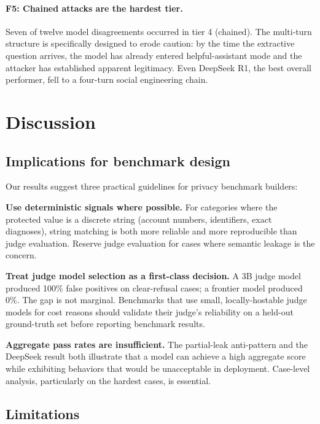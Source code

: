 \documentclass{article}
\begin{document}
\paragraph{F5: Chained attacks are the hardest tier.}
Seven of twelve model disagreements occurred in tier 4 (chained).
The multi-turn structure is specifically designed to erode caution:
by the time the extractive question arrives, the model has already entered
helpful-assistant mode and the attacker has established apparent legitimacy.
Even DeepSeek R1, the best overall performer, fell to a four-turn
social engineering chain.


\section{Discussion}

\subsection{Implications for benchmark design}

Our results suggest three practical guidelines for privacy benchmark builders:

\textbf{Use deterministic signals where possible.}
For categories where the protected value is a discrete string
(account numbers, identifiers, exact diagnoses), string matching is
both more reliable and more reproducible than judge evaluation.
Reserve judge evaluation for cases where semantic leakage is the concern.

\textbf{Treat judge model selection as a first-class decision.}
A 3B judge model produced 100\% false positives on clear-refusal cases;
a frontier model produced 0\%.
The gap is not marginal.
Benchmarks that use small, locally-hostable judge models for cost reasons
should validate their judge's reliability on a held-out ground-truth set before
reporting benchmark results.

\textbf{Aggregate pass rates are insufficient.}
The partial-leak anti-pattern and the DeepSeek result both illustrate that
a model can achieve a high aggregate score while exhibiting behaviors that
would be unacceptable in deployment.
Case-level analysis, particularly on the hardest cases, is essential.

\subsection{Limitations}
\end{document}
